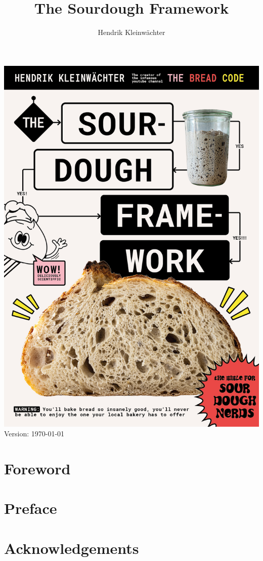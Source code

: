 \documentclass[a4paper, 12pt]{book}
\author{Hendrik Kleinwächter}
\title{The Sourdough Framework}
\begin{document}
\begin{titlepage}
	\centering
  \includegraphics[width=\textwidth]{images/cover-page.jpg}
  Version:
  \today
\end{titlepage}

\frontmatter

\tableofcontents

\chapter{Foreword}


\chapter{Preface}


\chapter{Acknowledgements}

\end{document}
